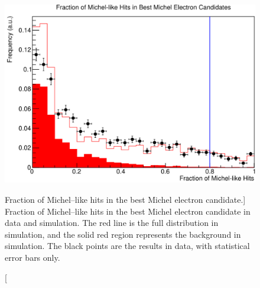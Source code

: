 \begin{figure}
	\centering
	\includegraphics[width=\textwidth]{figures/frac_michel.pdf}
	\caption
	[Fraction of Michel--like hits in the best Michel electron candidate.]
	{Fraction of Michel--like hits in the best Michel electron candidate in data
	and simulation. The red line is the full distribution in simulation, and the
	solid red region represents the background in simulation. The black
	points are the results in data, with statistical error bars only.}
	\label{fig:michel_like_frac}
\end{figure}

